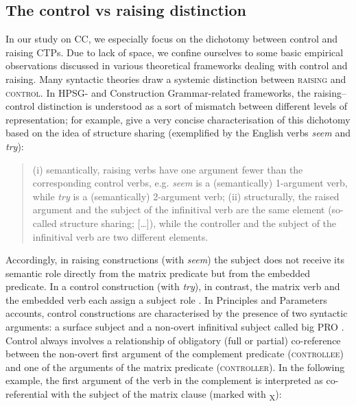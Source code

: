 \subsection{The control vs raising distinction}
\label{The control vs raising distinction}
In our study on CC, we especially focus on the dichotomy between control and raising CTPs. Due to lack of space, we confine ourselves to some basic empirical observations discussed in various theoretical frameworks dealing with control and raising. Many syntactic theories draw a systemic distinction between \textsc{raising} and \textsc{control}. In HPSG- and Construction Grammar-related frameworks, the raising--control distinction is understood as a sort of mismatch between different levels of representation; for example, \citet[34]{PrzepiorkowskiRosen05} give a very concise characterisation of this dichotomy based on the idea of structure sharing (exemplified by the English verbs \textit{seem} and \textit{try}): 

\begin{quotation}
(i) semantically, raising verbs have one argument fewer than the corresponding control verbs, e.g. \textit{seem} is a (semantically) 1-argument verb, while \textit{try} is a (semantically) 2-argument verb; (ii) structurally, the raised argument and the subject of the infinitival verb are the same element (so-called structure sharing; [\dots]), while the controller and the subject of the infinitival verb are two different elements.
\end{quotation}

Accordingly, in raising constructions (with \textit{seem}) the subject does not receive its semantic role directly from the matrix predicate but from the embedded predicate. In a control construction (with \textit{try}), in contrast, the matrix verb and the embedded verb each assign a subject role \citep[64f]{FriedOstman04}. In Principles and Parameters accounts, control constructions are characterised by the presence of two syntactic arguments: a surface subject and a non-overt infinitival subject called big PRO \citep[600]{Wurmbrand99}. Control always involves a relationship of obligatory (full or partial) co-reference between the non-overt first argument of the complement predicate (\textsc{controllee}) and one of the arguments of the matrix predicate (\textsc{controller}). In the following example, the first argument of the verb in the complement is interpreted as co-referential with the subject of the matrix clause (marked with \textsubscript{X}):

